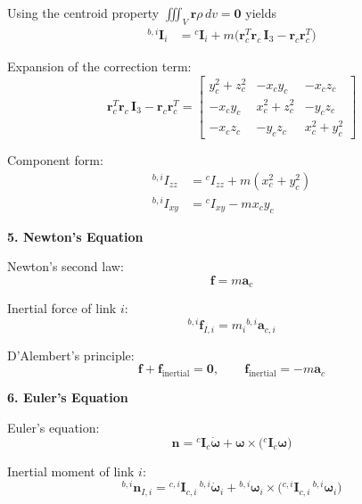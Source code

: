 \documentclass[12pt,a4paper]{report}
\newcommand{\vect}[1]{\mathbf{#1}}
\newcommand{\mat}[1]{\mathbf{#1}}
\newcommand{\angvel}{\boldsymbol{\omega}}
\begin{document}
Using the centroid property $\iiint_{V} \vect{r}\rho \, dv = \vect{0}$ yields
\begin{align}
{}^{b,i}\mat{I}_{i}
&=
{}^{c}\mat{I}_{i}
+
m\bigl(\vect{r}_{c}^{T}\vect{r}_{c}\,\mat{I}_{3} - \vect{r}_{c}\vect{r}_{c}^{T}\bigr)
\end{align}

Expansion of the correction term:
\begin{equation}
\vect{r}_{c}^{T}\vect{r}_{c}\,\mat{I}_{3} - \vect{r}_{c}\vect{r}_{c}^{T}
=
\begin{bmatrix}
y_{c}^{2} + z_{c}^{2} & -x_{c}y_{c} & -x_{c}z_{c} \\
-x_{c}y_{c} & x_{c}^{2} + z_{c}^{2} & -y_{c}z_{c} \\
-x_{c}z_{c} & -y_{c}z_{c} & x_{c}^{2} + y_{c}^{2}
\end{bmatrix}
\end{equation}

Component form:
\begin{align}
{}^{b,i}I_{zz} &= {}^{c}I_{zz} + m(x_{c}^{2} + y_{c}^{2}) \\
{}^{b,i}I_{xy} &= {}^{c}I_{xy} - mx_{c}y_{c}
\end{align}


\textbf{5. Newton's Equation}

Newton's second law:
\begin{equation}
\vect{f} = m\vect{a}_{c}
\end{equation}

Inertial force of link $i$:
\begin{equation}
{}^{b,i}\vect{f}_{I,i} = m_{i}{}^{b,i}\vect{a}_{c,i}
\end{equation}

D'Alembert's principle:
\begin{equation}
\vect{f} + \vect{f}_{\mathrm{inertial}} = \vect{0},
\qquad
\vect{f}_{\mathrm{inertial}} = -m\vect{a}_{c}
\end{equation}

\textbf{6. Euler's Equation}

Euler's equation:
\begin{equation}
\vect{n}
=
{}^{c}\mat{I}_{c}\dot{\angvel}
+
\angvel \times \bigl({}^{c}\mat{I}_{c}\angvel\bigr)
\end{equation}

Inertial moment of link $i$:
\begin{equation}
{}^{b,i}\vect{n}_{I,i}
=
{}^{c,i}\mat{I}_{c,i}\,{}^{b,i}\dot{\angvel}_{i}
+
{}^{b,i}\angvel_{i} \times \bigl({}^{c,i}\mat{I}_{c,i}\,{}^{b,i}\angvel_{i}\bigr)
\end{equation}
\end{document}
